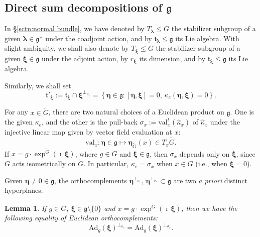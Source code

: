 \documentclass[12pt,a4paper]{article}
\theoremstyle{plain}
\newtheorem{lem}[thm]{Lemma}%
\theoremstyle{definition}
\begin{document}
\subsection{Direct sum decompositions of $\mathfrak{g}$}

\label{sctn:direct sum dec g}



In \S \ref{sctn:normal bundle}, we have denoted by 
$T_{\boldsymbol{\lambda}}\leqslant G$ the stabilizer subgroup
of a given $\boldsymbol{\lambda}\in \mathfrak{g}^\vee$ under the coadjoint action, and
by $\mathfrak{t}_{\boldsymbol{\lambda}}\leqslant \mathfrak{g}$
its Lie algebra. With slight 
ambiguity, we shall also denote by $T_{\boldsymbol{\xi}}\leqslant G$
the stabilizer subgroup of a given $\boldsymbol{\xi}\in \mathfrak{g}$
under the adjoint action,
by $r_{\boldsymbol{\xi}}$ its dimension, 
and
by $\mathfrak{t}_{\boldsymbol{\xi}}\leqslant \mathfrak{g}$
its Lie algebra.

Similarly, we shall set
\begin{equation}
\label{eqn:t'xi}
\mathfrak{t}'_{\boldsymbol{\xi}}:=
\mathfrak{t}_{\boldsymbol{\xi}}\cap \boldsymbol{\xi}^{\perp_{\kappa_e}}=
\left\{\boldsymbol{\eta}\in \mathfrak{g}:
[\boldsymbol{\eta},\boldsymbol{\xi}]=0,\,\kappa_e(\boldsymbol{\eta},\boldsymbol{\xi})=0\right\}.
\end{equation}

For any $x\in \tilde{G}$, 
there are two natural choices of a Euclidean product on $\mathfrak{g}$.
One is the given $\kappa_e$, and the other is the pull-back
$\sigma_x:=\mathrm{val}_x^t(\hat{\kappa}_x)$ of
$\hat{\kappa}_x$ under the injective linear map given by
vector field evaluation at $x$: 
$$
\mathrm{val}_x:\boldsymbol{\eta}\in \mathfrak{g}\mapsto
\boldsymbol{\eta}_{\tilde{G}}(x)\in T_x\tilde{G}.
$$
If $x=g\cdot\exp^{\tilde{G}}(\imath\,\boldsymbol{\xi})$, where
$g\in G$ and $\boldsymbol{\xi}\in \mathfrak{g}$, then 
$\sigma_x$ depends only on $\boldsymbol{\xi}$, 
since $G$ acts isometrically on $\tilde{G}$.
%
In particular, $\kappa_e=\sigma_x$ when $x\in G$ (i.e., when
$\boldsymbol{\xi}=0$).

Given $\boldsymbol{\eta}\neq 0\in \mathfrak{g}$, the orthocomplements
$\boldsymbol{\eta}^{\perp_{\kappa_e}},\,\boldsymbol{\eta}^{\perp_{\sigma_x}}
\subset \mathfrak{g}$ are two \textit{a priori} distinct hyperplanes.

\begin{lem}
\label{lem:same orthocomplement}
If $g\in G$, $\boldsymbol{\xi}\in \mathfrak{g}\setminus \{0\}$ and $x=g\cdot\exp^{\tilde{G}}(\imath\,\boldsymbol{\xi})$, then
we have the following equality of Euclidean orthocomplements:
$$
\mathrm{Ad}_g(\boldsymbol{\xi})^{\perp_{\kappa_e}}
=\mathrm{Ad}_g(\boldsymbol{\xi})^{\perp_{\sigma_x}}.
$$
\end{lem}
\end{document}
